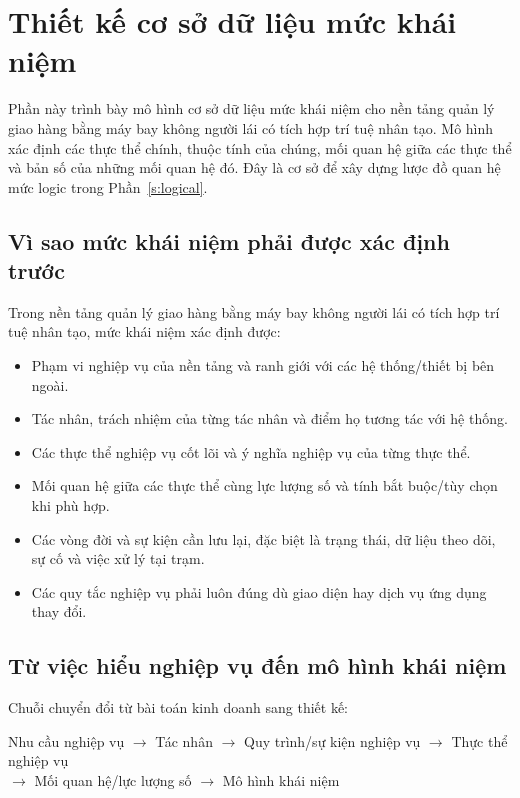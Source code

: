 \section{Thiết kế cơ sở dữ liệu mức khái niệm}\label{s:conceptual}

Phần này trình bày mô hình cơ sở dữ liệu mức khái niệm cho nền tảng quản lý giao hàng bằng máy bay không người lái có tích hợp trí tuệ nhân tạo. Mô hình xác định các thực thể chính, thuộc tính của chúng, mối quan hệ giữa các thực thể và bản số của những mối quan hệ đó. Đây là cơ sở để xây dựng lược đồ quan hệ mức logic trong Phần~\ref{s:logical}.

\subsection{Vì sao mức khái niệm phải được xác định trước}

Trong nền tảng quản lý giao hàng bằng máy bay không người lái có tích hợp trí tuệ nhân tạo, mức khái niệm xác định được:
\begin{itemize}
    \item Phạm vi nghiệp vụ của nền tảng và ranh giới với các hệ thống/thiết bị bên ngoài.
    \item Tác nhân, trách nhiệm của từng tác nhân và điểm họ tương tác với hệ thống.
    \item Các thực thể nghiệp vụ cốt lõi và ý nghĩa nghiệp vụ của từng thực thể.
    \item Mối quan hệ giữa các thực thể cùng lực lượng số và tính bắt buộc/tùy chọn khi phù hợp.
    \item Các vòng đời và sự kiện cần lưu lại, đặc biệt là trạng thái, dữ liệu theo dõi, sự cố và việc xử lý tại trạm.
    \item Các quy tắc nghiệp vụ phải luôn đúng dù giao diện hay dịch vụ ứng dụng thay đổi.
\end{itemize}

\subsection{Từ việc hiểu nghiệp vụ đến mô hình khái niệm}

Chuỗi chuyển đổi từ bài toán kinh doanh sang thiết kế:

\begin{center}
Nhu cầu nghiệp vụ $\to$ Tác nhân $\to$ Quy trình/sự kiện nghiệp vụ $\to$ Thực thể nghiệp vụ\\
$\to$ Mối quan hệ/lực lượng số $\to$ Mô hình khái niệm
\end{center}


